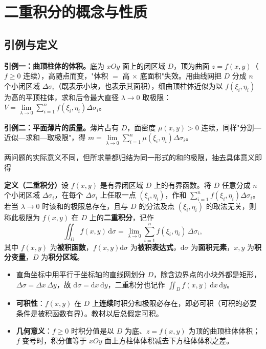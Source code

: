 
\section{二重积分的概念与性质}
\subsection{引例与定义}

\textbf{引例一：曲顶柱体的体积。}底为 $xOy$ 面上的闭区域 $D$，顶为曲面 $z=f(x,y)$（$f\ge0$ 连续），高随点而变，"体积 $=$ 高 $\times$ 底面积"失效。用曲线网把 $D$ 分成 $n$ 个小闭区域 $\Delta\sigma_i$（既表示小块，也表示其面积），细曲顶柱体近似为以 $f(\xi_i,\eta_i)$ 为高的平顶柱体，求和后令最大直径 $\lambda\to0$ 取极限：$V=\lim\limits_{\lambda\to0}\sum\limits_{i=1}^{n}f(\xi_i,\eta_i)\Delta\sigma_i$。

\textbf{引例二：平面薄片的质量。}薄片占有 $D$，面密度 $\mu(x,y)>0$ 连续，同样"分割—近似—求和—取极限"，得 $m=\lim\limits_{\lambda\to0}\sum\limits_{i=1}^{n}\mu(\xi_i,\eta_i)\Delta\sigma_i$。

两问题的实际意义不同，但所求量都归结为同一形式的和的极限，抽去具体意义即得

\textbf{定义（二重积分）}\quad 设 $f(x,y)$ 是有界闭区域 $D$ 上的有界函数。将 $D$ 任意分成 $n$ 个小闭区域 $\Delta\sigma_i$，在每个 $\Delta\sigma_i$ 上任取一点 $(\xi_i,\eta_i)$，作和 $\sum\limits_{i=1}^{n}f(\xi_i,\eta_i)\Delta\sigma_i$。若当 $\lambda\to0$ 时该和的极限总存在，且与 $D$ 的分法及点 $(\xi_i,\eta_i)$ 的取法无关，则称此极限为 $f(x,y)$ 在 $D$ 上的\textbf{二重积分}，记作
\[
\iint_D f(x,y)\,\mathrm{d}\sigma=\lim_{\lambda\to0}\sum_{i=1}^{n}f(\xi_i,\eta_i)\,\Delta\sigma_i ,
\]
其中 $f(x,y)$ 为\textbf{被积函数}，$f(x,y)\mathrm{d}\sigma$ 为\textbf{被积表达式}，$\mathrm{d}\sigma$ 为\textbf{面积元素}，$x,y$ 为\textbf{积分变量}，$D$ 为\textbf{积分区域}。

\begin{itemize}
  \item 直角坐标中用平行于坐标轴的直线网划分 $D$，除含边界点的小块外都是矩形，$\Delta\sigma=\Delta x\,\Delta y$，故 $\mathrm{d}\sigma=\mathrm{d}x\,\mathrm{d}y$，二重积分也记作 $\iint_Df(x,y)\,\mathrm{d}x\,\mathrm{d}y$。
  \item \textbf{可积性}：$f(x,y)$ 在 $D$ 上\textbf{连续}时积分和极限必存在，即必可积（可积的必要条件是被积函数有界）。教材以后总假定可积。
  \item \textbf{几何意义}：$f\ge0$ 时积分值是以 $D$ 为底、$z=f(x,y)$ 为顶的曲顶柱体体积；$f$ 变号时，积分值等于 $xOy$ 面上方柱体体积减去下方柱体体积之差。
\end{itemize}

